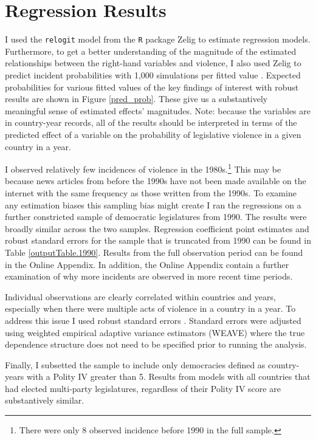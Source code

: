 \documentclass[a4paper]{article}\usepackage[]{graphicx}\usepackage[]{color}
\begin{document}
\section*{Regression Results}

I used the {\tt{relogit}} model from the {\tt{R}} package Zelig \citep{IMAIKingZelig2008} to estimate regression models. Furthermore, to get a better understanding of the magnitude of the estimated relationships between the right-hand variables and violence, I also used Zelig to predict incident probabilities with 1,000 simulations per fitted value \citep[]{King2002}. Expected probabilities for various fitted values of the key findings of interest with robust results are shown in Figure \ref{pred_prob}. These give us a substantively meaningful sense of estimated effects' magnitudes. Note: because the variables are in country-year records, all of the results should be interpreted in terms of the predicted effect of a variable on the probability of legislative violence in a given country in a year.

I observed relatively few incidences of violence in the 1980s.\footnote{There were only 8 observed incidence before 1990 in the full sample.} This may be because news articles from before the 1990s have not been made available on the internet with the same frequency as those written from the 1990s. To examine any estimation biases this sampling bias might create I ran the regressions on a further constricted sample of democratic legislatures from 1990. The results were broadly similar across the two samples. Regression coefficient point estimates and robust standard errors for the sample that is truncated from 1990 can be found in Table \ref{outputTable.1990}. Results from the full observation period can be found in the Online Appendix. In addition, the Online Appendix contain a further examination of why more incidents are observed in more recent time periods.

Individual observations are clearly correlated within countries and years, especially when there were multiple acts of violence in a country in a year. To address this issue I used robust standard errors \citep{Golder2006, Mainwaring2007}. Standard errors were adjusted using \cite{Lumley1999} weighted empirical adaptive variance estimators (WEAVE) where the true dependence structure does not need to be specified prior to running the analysis.

Finally, I subsetted the sample to include only democracies defined as country-years with a Polity IV greater than 5. Results from models with all countries that had elected multi-party legislatures, regardless of their Polity IV score are substantively similar.
\end{document}
